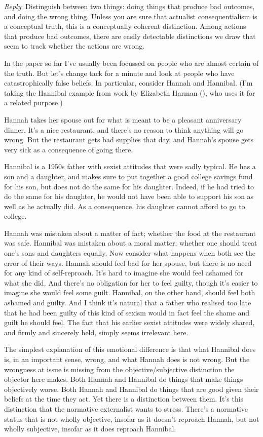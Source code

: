 \documentclass[
  10pt,
  letterpaper,
  DIV=11,
  numbers=noendperiod,
  twoside]{scrartcl}
\begin{document}
\emph{Reply}: Distinguish between two things: doing things that produce
bad outcomes, and doing the wrong thing. Unless you are sure that
actualist consequentialism is a conceptual truth, this is a conceptually
coherent distinction. Among actions that produce bad outcomes, there are
easily detectable distinctions we draw that seem to track whether the
actions are wrong.

In the paper so far I've usually been focussed on people who are almost
certain of the truth. But let's change tack for a minute and look at
people who have catastrophically false beliefs. In particular, consider
Hannah and Hannibal. (I'm taking the Hannibal example from work by
Elizabeth Harman (), who uses it for a
related purpose.)

Hannah takes her spouse out for what is meant to be a pleasant
anniversary dinner. It's a nice restaurant, and there's no reason to
think anything will go wrong. But the restaurant gets bad supplies that
day, and Hannah's spouse gets very sick as a consequence of going there.

Hannibal is a 1950s father with sexist attitudes that were sadly
typical. He has a son and a daughter, and makes sure to put together a
good college savings fund for his son, but does not do the same for his
daughter. Indeed, if he had tried to do the same for his daughter, he
would not have been able to support his son as well as he actually did.
As a consequence, his daughter cannot afford to go to college.

Hannah was mistaken about a matter of fact; whether the food at the
restaurant was safe. Hannibal was mistaken about a moral matter; whether
one should treat one's sons and daughters equally. Now consider what
happens when both see the error of their ways. Hannah should feel bad
for her spouse, but there is no need for any kind of self-reproach. It's
hard to imagine she would feel ashamed for what she did. And there's no
obligation for her to feel guilty, though it's easier to imagine she
would feel some guilt. Hannibal, on the other hand, should feel both
ashamed and guilty. And I think it's natural that a father who realised
too late that he had been guilty of this kind of sexism would in fact
feel the shame and guilt he should feel. The fact that his earlier
sexist attitudes were widely shared, and firmly and sincerely held,
simply seems irrelevant here.

The simplest explanation of this emotional difference is that what
Hannibal does is, in an important sense, wrong, and what Hannah does is
not wrong. But the wrongness at issue is missing from the
objective/subjective distinction the objector here makes. Both Hannah
and Hannibal do things that make things objectively worse. Both Hannah
and Hannibal do things that are good given their beliefs at the time
they act. Yet there is a distinction between them. It's this distinction
that the normative externalist wants to stress. There's a normative
status that is not wholly objective, insofar as it doesn't reproach
Hannah, but not wholly subjective, insofar as it does reproach Hannibal.
\end{document}
